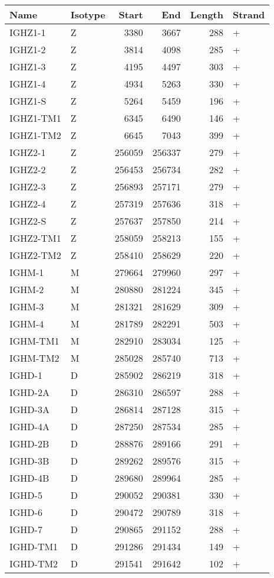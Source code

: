 \begin{tabular}{llrrrl}
  \toprule Name & Isotype & Start & End & Length & Strand \\ 
  \midrule IGHZ1-1 & Z & 3380 & 3667 & 288 & + \\ 
  IGHZ1-2 & Z & 3814 & 4098 & 285 & + \\ 
  IGHZ1-3 & Z & 4195 & 4497 & 303 & + \\ 
  IGHZ1-4 & Z & 4934 & 5263 & 330 & + \\ 
  IGHZ1-S & Z & 5264 & 5459 & 196 & + \\ 
  IGHZ1-TM1 & Z & 6345 & 6490 & 146 & + \\ 
  IGHZ1-TM2 & Z & 6645 & 7043 & 399 & + \\ 
  IGHZ2-1 & Z & 256059 & 256337 & 279 & + \\ 
  IGHZ2-2 & Z & 256453 & 256734 & 282 & + \\ 
  IGHZ2-3 & Z & 256893 & 257171 & 279 & + \\ 
  IGHZ2-4 & Z & 257319 & 257636 & 318 & + \\ 
  IGHZ2-S & Z & 257637 & 257850 & 214 & + \\ 
  IGHZ2-TM1 & Z & 258059 & 258213 & 155 & + \\ 
  IGHZ2-TM2 & Z & 258410 & 258629 & 220 & + \\ 
  IGHM-1 & M & 279664 & 279960 & 297 & + \\ 
  IGHM-2 & M & 280880 & 281224 & 345 & + \\ 
  IGHM-3 & M & 281321 & 281629 & 309 & + \\ 
  IGHM-4 & M & 281789 & 282291 & 503 & + \\ 
  IGHM-TM1 & M & 282910 & 283034 & 125 & + \\ 
  IGHM-TM2 & M & 285028 & 285740 & 713 & + \\ 
  IGHD-1 & D & 285902 & 286219 & 318 & + \\ 
  IGHD-2A & D & 286310 & 286597 & 288 & + \\ 
  IGHD-3A & D & 286814 & 287128 & 315 & + \\ 
  IGHD-4A & D & 287250 & 287534 & 285 & + \\ 
  IGHD-2B & D & 288876 & 289166 & 291 & + \\ 
  IGHD-3B & D & 289262 & 289576 & 315 & + \\ 
  IGHD-4B & D & 289680 & 289964 & 285 & + \\ 
  IGHD-5 & D & 290052 & 290381 & 330 & + \\ 
  IGHD-6 & D & 290472 & 290789 & 318 & + \\ 
  IGHD-7 & D & 290865 & 291152 & 288 & + \\ 
  IGHD-TM1 & D & 291286 & 291434 & 149 & + \\ 
  IGHD-TM2 & D & 291541 & 291642 & 102 & + \\ 
   \bottomrule \end{tabular}
